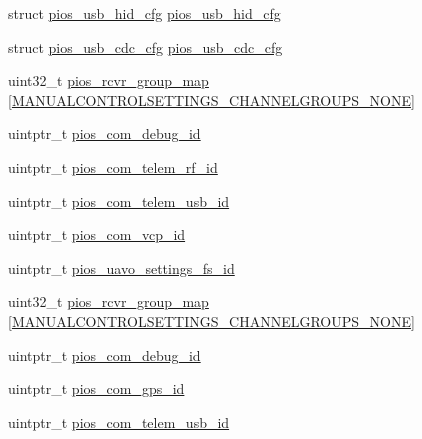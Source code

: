 \begin{DoxyCompactItemize}
struct \hyperlink{structpios__usb__hid__cfg}{pios\-\_\-usb\-\_\-hid\-\_\-cfg} \hyperlink{group___flying_f3_ga3665f6d3a2cccc431b55b9432291e94c}{pios\-\_\-usb\-\_\-hid\-\_\-cfg}
\item 
struct \hyperlink{structpios__usb__cdc__cfg}{pios\-\_\-usb\-\_\-cdc\-\_\-cfg} \hyperlink{group___flying_f3_ga05cc3e449d417c7f9097d2659e6f5ca3}{pios\-\_\-usb\-\_\-cdc\-\_\-cfg}
\item 
uint32\-\_\-t \hyperlink{group___flying_f3_ga6c6cfc16eb738e47c123298e062297e2}{pios\-\_\-rcvr\-\_\-group\-\_\-map} \mbox{[}\hyperlink{group___manual_control_settings_gga94e1fe696fef2f85cbdb4a2e479c7ed2af9104b4e2c50328b0912db1e10fc3074}{\-M\-A\-N\-U\-A\-L\-C\-O\-N\-T\-R\-O\-L\-S\-E\-T\-T\-I\-N\-G\-S\-\_\-\-C\-H\-A\-N\-N\-E\-L\-G\-R\-O\-U\-P\-S\-\_\-\-N\-O\-N\-E}\mbox{]}
\item 
uintptr\-\_\-t \hyperlink{group___flying_f3_ga14dc9e3d330b80a37a9699c2112358e0}{pios\-\_\-com\-\_\-debug\-\_\-id}
\item 
uintptr\-\_\-t \hyperlink{group___flying_f3_gae48e848f715b08971e23528feee79339}{pios\-\_\-com\-\_\-telem\-\_\-rf\-\_\-id}
\item 
uintptr\-\_\-t \hyperlink{group___flying_f3_ga513cc36d72b76de2fcb75ff233a79a4a}{pios\-\_\-com\-\_\-telem\-\_\-usb\-\_\-id}
\item 
uintptr\-\_\-t \hyperlink{group___flying_f3_gaaeb3e0d65ed5c6e7b921c54e1ad905db}{pios\-\_\-com\-\_\-vcp\-\_\-id}
\item 
uintptr\-\_\-t \hyperlink{group___flying_f3_gab060f441dd600b08386c0ca1b487217a}{pios\-\_\-uavo\-\_\-settings\-\_\-fs\-\_\-id}
\item 
uint32\-\_\-t \hyperlink{group___flying_f3_ga6c6cfc16eb738e47c123298e062297e2}{pios\-\_\-rcvr\-\_\-group\-\_\-map} \mbox{[}\hyperlink{group___manual_control_settings_gga94e1fe696fef2f85cbdb4a2e479c7ed2af9104b4e2c50328b0912db1e10fc3074}{\-M\-A\-N\-U\-A\-L\-C\-O\-N\-T\-R\-O\-L\-S\-E\-T\-T\-I\-N\-G\-S\-\_\-\-C\-H\-A\-N\-N\-E\-L\-G\-R\-O\-U\-P\-S\-\_\-\-N\-O\-N\-E}\mbox{]}
\item 
uintptr\-\_\-t \hyperlink{group___flying_f3_ga14dc9e3d330b80a37a9699c2112358e0}{pios\-\_\-com\-\_\-debug\-\_\-id}
\item 
uintptr\-\_\-t \hyperlink{group___flying_f3_ga05dca72c42c6c2b33fa62b8ee0fcb2ea}{pios\-\_\-com\-\_\-gps\-\_\-id}
\item 
uintptr\-\_\-t \hyperlink{group___flying_f3_ga513cc36d72b76de2fcb75ff233a79a4a}{pios\-\_\-com\-\_\-telem\-\_\-usb\-\_\-id}
\item 

\end{DoxyCompactItemize}
